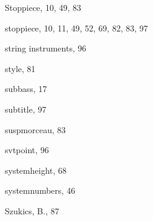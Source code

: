 \begin{theindex}
  \item {\Bslash Stoppiece}, 10, 49, 83
  \item {\Bslash stoppiece}, 10, 11, 49, 52, 69, 82, 83, 97
  \item string instruments, 96
  \item style, 81
  \item subbass, 17
  \item {\Bslash subtitle}, 97
  \item {\Bslash suspmorceau}, 83
  \item {\Bslash svtpoint}, 96
  \item {\Bslash systemheight}, 68
  \item {\Bslash systemnumbers}, 46
  \item {\sc Szukics, B.}, 87

  \indexspace


\end{theindex}
